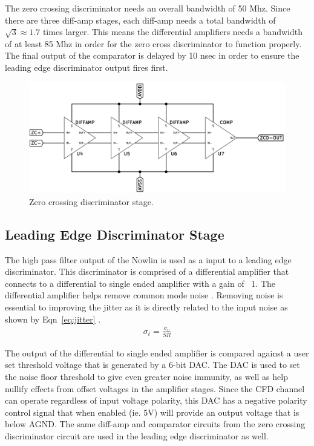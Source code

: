 \documentclass[12pt,oneside,final]{siuethesis}
\theoremstyle{definition}
\begin{document}
\par The zero crossing discriminator needs an overall bandwidth of 50 Mhz. Since there are three diff-amp stages, each diff-amp needs a total bandwidth of $\sqrt{3} \approx 1.7$  times larger. This means the differential amplifiers needs a bandwidth of at least 85 Mhz in order for the zero cross discriminator to function properly. The final output of the comparator is delayed by 10 nsec in order to ensure the leading edge discriminator output fires first.\newpage
\begin{figure}[ht]
\centering
\includegraphics[scale=.55,keepaspectratio=true]{images/zcd_circuit.png} 
\caption{Zero crossing discriminator stage.}
\label{fig:ZCD}
\end{figure}
\subsection{Leading Edge Discriminator Stage}
\par The high pass filter output of the Nowlin is used as a input to a leading edge discriminator. This discriminator is comprised of a differential amplifier that connects to a differential to single ended amplifier with a gain of ~1. The differential amplifier helps remove common mode noise \cite{COMMON_MODE}. Removing noise is essential to improving the jitter as it is directly related to the input noise  as shown by Eqn~\ref{eq:jitter} \cite{CFD}. 
\begin{eqnarray}
\sigma _t  = \frac{\sigma _v}{SR}
\label{eq:jitter}
\end{eqnarray}
\par The output of the differential to single ended amplifier is compared against a user set threshold voltage that is generated by a 6-bit DAC. The DAC is used to set the noise floor threshold to give even greater noise immunity, as well as help nullify effects from offset voltages in the amplifier stages. Since the CFD channel can operate regardless of input voltage polarity, this DAC has a negative polarity control signal that when enabled (ie. 5V) will provide an output voltage that is below AGND. The same diff-amp and comparator circuits from the zero crossing discriminator circuit are used in the leading edge discriminator as well. 
\end{document}
